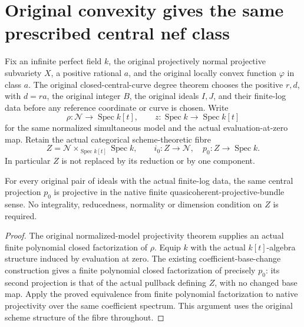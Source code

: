 \section{Original convexity gives the same prescribed central nef class}

Fix an infinite perfect field $k$, the original projectively normal
projective subvariety $X$, a positive rational $a$, and the original
locally convex function $\varphi$ in class $a$.  The original
closed-central-curve degree theorem chooses the positive $r,d$, with
$d=ra$, the original integer $B$, the original ideals $I,J$, and their
finite-log data before any reference coordinate or curve is chosen.
Write
\[
 \rho:\mathcal N\longrightarrow\operatorname{Spec}k[t],\qquad
 z:\operatorname{Spec}k\longrightarrow\operatorname{Spec}k[t]
\]
for the same normalized simultaneous model and the actual evaluation-at-zero
map.  Retain the actual categorical scheme-theoretic fibre
\[
 Z=\mathcal N\times_{\operatorname{Spec}k[t]}\operatorname{Spec}k,
 \qquad i_0:Z\longrightarrow\mathcal N,\quad p_0:Z\longrightarrow\operatorname{Spec}k.
\]
In particular $Z$ is not replaced by its reduction or by one component.

\begin{lemma}
\label{lem:intrinsic-original-normalized-central-native-projective}
\leanok
{}
For every original pair of ideals with the actual finite-log data, the
same central projection $p_0$ is projective in the native finite
quasicoherent-projective-bundle sense.  No integrality, reducedness,
normality or dimension condition on $Z$ is required.
\end{lemma}
\begin{proof}
The original normalized-model projectivity theorem supplies an actual
finite polynomial closed factorization of $\rho$.  Equip $k$ with the
actual $k[t]$-algebra structure induced by evaluation at zero.  The
existing coefficient-base-change construction gives a finite polynomial
closed factorization of precisely $p_0$: its second projection is that
of the actual pullback defining $Z$, with no changed base map.  Apply
the proved equivalence from finite polynomial factorization to native
projectivity over the same coefficient spectrum.  This argument uses
the original scheme structure of the fibre throughout.
\end{proof}

